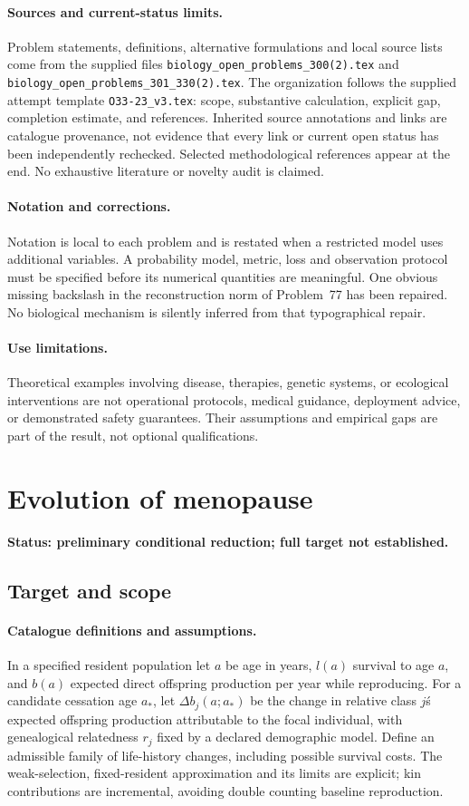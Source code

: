 \documentclass[11pt]{article}
\begin{document}
\paragraph{Sources and current-status limits.}
Problem statements, definitions, alternative formulations and local source lists
come from the supplied files
\texttt{biology\_open\_problems\_300(2).tex} and
\texttt{biology\_open\_problems\_301\_330(2).tex}.
The organization follows the supplied attempt template
\texttt{O33-23\_v3.tex}: scope, substantive calculation, explicit gap,
completion estimate, and references. Inherited source annotations and links are
catalogue provenance, not evidence that every link or current open status has
been independently rechecked. Selected methodological references appear at the
end. No exhaustive literature or novelty audit is claimed.

\paragraph{Notation and corrections.}
Notation is local to each problem and is restated when a restricted model uses
additional variables. A probability model, metric, loss and observation protocol
must be specified before its numerical quantities are meaningful. One obvious
missing backslash in the reconstruction norm of Problem~77 has been repaired.
No biological mechanism is silently inferred from that typographical repair.

\paragraph{Use limitations.}
Theoretical examples involving disease, therapies, genetic systems, or ecological
interventions are not operational protocols, medical guidance, deployment advice,
or demonstrated safety guarantees. Their assumptions and empirical gaps are part
of the result, not optional qualifications.


\section*{Evolution of menopause}
\label{prob:322}
\noindent\textbf{Status: preliminary conditional reduction; full target not established.}
\subsection{Target and scope}
\paragraph{Catalogue definitions and assumptions.}
In a specified resident population let $a$ be age in years, $l(a)$ survival to age $a$, and $b(a)$ expected direct offspring production per year while reproducing. For a candidate cessation age $a_*$, let $\Delta b_j(a;a_*)$ be the change in relative class $j$\'s expected offspring production attributable to the focal individual, with genealogical relatedness $r_j$ fixed by a declared demographic model. Define an admissible family of life-history changes, including possible survival costs. The weak-selection, fixed-resident approximation and its limits are explicit; kin contributions are incremental, avoiding double counting baseline reproduction.
\end{document}
